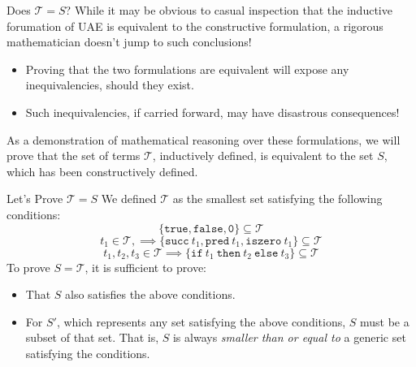 \documentclass[11pt]{beamer}
\begin{document}
\begin{frame}[fragile=singleslide]{Does $\mathcal{T} = S$?}
While it may be obvious to casual inspection that the inductive forumation of UAE is equivalent to the constructive formulation, a rigorous mathematician doesn't jump to such conclusions!
\begin{itemize}
\item Proving that the two formulations are equivalent will expose any inequivalencies, should they exist.  
\item Such inequivalencies, if carried forward, may have disastrous consequences! 
\end{itemize}
As a demonstration of mathematical reasoning over these formulations, we will prove that the set of terms $\mathcal{T}$, inductively defined, is equivalent to the set $S$, which has been constructively defined.  
\end{frame}

\begin{frame}[fragile=singleslide]{Let's Prove $\mathcal{T} = S$}
We defined $\mathcal{T}$ as the smallest set satisfying the following conditions:
\begin{equation}
\{\texttt{true}, \texttt{false}, \texttt{0}\} \subseteq \mathcal{T}
\end{equation}
\begin{equation}
t_1 \in \mathcal{T}, \implies \{\texttt{succ}\: t_1, \texttt{pred}\: t_1, \texttt{iszero}\: t_1\} \subseteq \mathcal{T}
\end{equation}
\begin{equation}
t_1, t_2, t_3 \in \mathcal{T} \implies \{ \texttt{if}\: t_1 \:\texttt{then}\: t_2 \:\texttt{else}\: t_3\} \subseteq \mathcal{T}
\end{equation}
To prove $S = \mathcal{T}$, it is sufficient to prove:
\begin{itemize}
\item That $S$ also satisfies the above conditions.
\item For $S'$, which represents any set satisfying the above conditions, $S$ must be a subset of that set.  That is, $S$ is always \emph{smaller than or equal to} a generic set satisfying the conditions.  
\end{itemize}
\end{frame}
\end{document}
